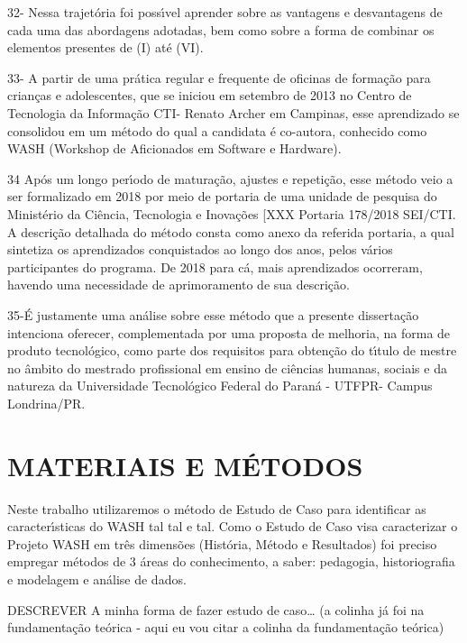 \documentclass[
12pt,		%
openright,	%
twoside,  %
a4paper,			%
chapter=TITLE,		%
english,			%
french,				%
spanish,			%
brazil				%
]{USPSC-classe/USPSC}
\begin{document}
32- Nessa trajet\'oria foi poss\'{\i}vel aprender sobre as vantagens e desvantagens de cada uma das abordagens adotadas, bem como sobre a forma de combinar os elementos presentes de (I) at\'e (VI).




33- A partir de uma pr\'atica regular e frequente de oficinas de forma\c{c}\~ao para  crian\c{c}as e adolescentes, que se iniciou em setembro de 2013 no Centro de Tecnologia da Informa\c{c}\~ao CTI- Renato Archer em Campinas, esse aprendizado se consolidou em um m\'etodo do qual a candidata \'e co-autora, conhecido como WASH (Workshop de Aficionados em Software e Hardware).




34 Ap\'os um longo per\'{\i}odo de matura\c{c}\~ao, ajustes e repeti\c{c}\~ao, esse m\'etodo veio a ser formalizado em 2018 por meio de portaria de uma unidade de pesquisa do Minist\'erio da Ci\^encia, Tecnologia e Inova\c{c}\~oes [XXX Portaria 178/2018 SEI/CTI. A descri\c{c}\~ao detalhada do m\'etodo consta como anexo da referida portaria, a qual sintetiza os aprendizados conquistados ao longo dos anos, pelos v\'arios participantes do programa. De 2018 para c\'a, mais aprendizados ocorreram, havendo uma necessidade de aprimoramento de sua descri\c{c}\~ao.




35-\'E justamente uma an\'alise sobre esse m\'etodo que a presente disserta\c{c}\~ao intenciona oferecer, complementada por uma proposta de melhoria, na forma de produto tecnol\'ogico, como parte dos requisitos para obten\c{c}\~ao do t\'{\i}tulo de mestre no \^ambito do mestrado profissional em ensino de ci\^encias humanas, sociais e da natureza da Universidade  Tecnol\'ogico  Federal do Paran\'a - UTFPR- Campus Londrina/PR.




\chapter[MATERIAIS E M\'ETODOS]{MATERIAIS E M\'ETODOS}\label{MATERIAIS E M\'ETODOS}
Neste trabalho utilizaremos o m\'etodo de Estudo de Caso para identificar as caracter\'{\i}sticas do WASH tal tal e tal. Como o Estudo de Caso visa caracterizar o Projeto WASH em tr\^es dimens\~oes (Hist\'oria, M\'etodo e Resultados) foi preciso empregar m\'etodos de 3 \'areas do conhecimento, a saber: pedagogia, historiografia e modelagem e an\'alise de dados. 




DESCREVER A minha forma de fazer estudo de caso… (a colinha j\'a foi na fundamenta\c{c}\~ao te\'orica - aqui eu vou citar a colinha da fundamenta\c{c}\~ao te\'orica)
\end{document}
